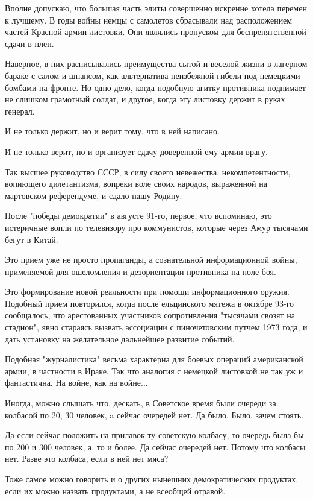 Вполне допускаю, что большая часть элиты совершенно искренне хотела перемен к
лучшему. В годы войны немцы с самолетов сбрасывали над расположением частей
Красной армии листовки. Они являлись пропуском для беспрепятственной сдачи в
плен.

Наверное, в них расписывались преимущества сытой и веселой жизни в лагерном
бараке с салом и шнапсом, как альтернатива неизбежной гибели под немецкими
бомбами на фронте. Но одно дело, когда подобную агитку противника поднимает не
слишком грамотный солдат, и другое, когда эту листовку держит в руках генерал.

И не только держит, но и верит тому, что в ней написано.

И не только верит, но и организует сдачу доверенной ему армии врагу.

Так высшее руководство СССР, в силу своего невежества, некомпетентности,
вопиющего дилетантизма, вопреки воле своих народов, выраженной на мартовском
референдуме, и сдало нашу Родину.

После "победы демократии" в августе 91-го, первое, что вспоминаю, это
истеричные вопли по телевизору про коммунистов, которые через Амур тысячами
бегут в Китай.

Это прием уже не просто пропаганды, а сознательной информационной войны,
применяемой для ошеломления и дезориентации противника на поле боя.

Это формирование новой реальности при помощи информационного оружия. Подобный
прием повторился, когда после ельцинского мятежа в октябре 93-го сообщалось,
что арестованных участников сопротивления "тысячами свозят на стадион", явно
стараясь вызвать ассоциации с пиночетовским путчем 1973 года, и дать установку
на желательное дальнейшее развитие событий.

Подобная "журналистика" весьма характерна для боевых операций американской
армии, в частности в Ираке. Так что аналогия с немецкой листовкой не так уж и
фантастична. На войне, как на войне...

Иногда, можно слышать что, дескать, в Советское время были очереди за колбасой
по 20, 30 человек, a сейчас очередей нет. Да было. Было, зачем стоять.

Да если сейчас положить на прилавок ту советскую колбасу, то очередь была бы по
200 и 300 человек, а, то и более. Да сейчас очередей нет. Потому что колбасы
нет. Разве это колбаса, если в ней нет мяса?

Тоже самое можно говорить и о других нынешних демократических продуктах, если
их можно назвать продуктами, а не всеобщей отравой.

